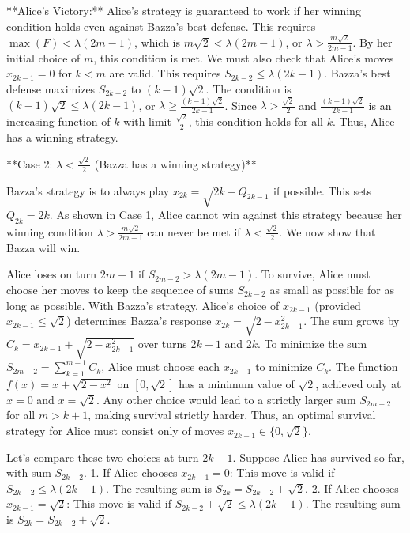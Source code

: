 \documentclass[12pt]{article}
\begin{document}
**Alice's Victory:**
Alice's strategy is guaranteed to work if her winning condition holds even against Bazza's best defense. This requires $\max(F) < \lambda(2m-1)$, which is $m\sqrt{2} < \lambda(2m-1)$, or $\lambda > \frac{m\sqrt{2}}{2m-1}$. By her initial choice of $m$, this condition is met. We must also check that Alice's moves $x_{2k-1}=0$ for $k<m$ are valid. This requires $S_{2k-2} \le \lambda(2k-1)$. Bazza's best defense maximizes $S_{2k-2}$ to $(k-1)\sqrt{2}$. The condition is $(k-1)\sqrt{2} \le \lambda(2k-1)$, or $\lambda \ge \frac{(k-1)\sqrt{2}}{2k-1}$. Since $\lambda > \frac{\sqrt{2}}{2}$ and $\frac{(k-1)\sqrt{2}}{2k-1}$ is an increasing function of $k$ with limit $\frac{\sqrt{2}}{2}$, this condition holds for all $k$. Thus, Alice has a winning strategy.

**Case 2: $\lambda < \frac{\sqrt{2}}{2}$ (Bazza has a winning strategy)**

Bazza's strategy is to always play $x_{2k} = \sqrt{2k - Q_{2k-1}}$ if possible. This sets $Q_{2k}=2k$. As shown in Case 1, Alice cannot win against this strategy because her winning condition $\lambda > \frac{m\sqrt{2}}{2m-1}$ can never be met if $\lambda < \frac{\sqrt{2}}{2}$. We now show that Bazza will win.

Alice loses on turn $2m-1$ if $S_{2m-2} > \lambda(2m-1)$. To survive, Alice must choose her moves to keep the sequence of sums $S_{2k-2}$ as small as possible for as long as possible.
With Bazza's strategy, Alice's choice of $x_{2k-1}$ (provided $x_{2k-1} \le \sqrt{2}$) determines Bazza's response $x_{2k}=\sqrt{2-x_{2k-1}^2}$. The sum grows by $C_k = x_{2k-1} + \sqrt{2-x_{2k-1}^2}$ over turns $2k-1$ and $2k$.
To minimize the sum $S_{2m-2} = \sum_{k=1}^{m-1} C_k$, Alice must choose each $x_{2k-1}$ to minimize $C_k$. The function $f(x)=x+\sqrt{2-x^2}$ on $[0, \sqrt{2}]$ has a minimum value of $\sqrt{2}$, achieved only at $x=0$ and $x=\sqrt{2}$. Any other choice would lead to a strictly larger sum $S_{2m-2}$ for all $m>k+1$, making survival strictly harder. Thus, an optimal survival strategy for Alice must consist only of moves $x_{2k-1} \in \{0, \sqrt{2}\}$.

Let's compare these two choices at turn $2k-1$. Suppose Alice has survived so far, with sum $S_{2k-2}$.
1.  If Alice chooses $x_{2k-1}=0$: This move is valid if $S_{2k-2} \le \lambda(2k-1)$. The resulting sum is $S_{2k} = S_{2k-2} + \sqrt{2}$.
2.  If Alice chooses $x_{2k-1}=\sqrt{2}$: This move is valid if $S_{2k-2}+\sqrt{2} \le \lambda(2k-1)$. The resulting sum is $S_{2k} = S_{2k-2} + \sqrt{2}$.
\end{document}
